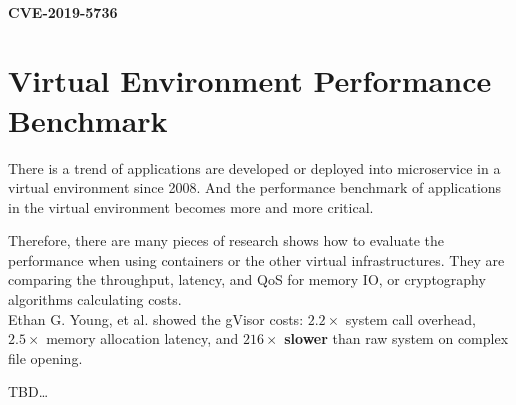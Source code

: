 
\paragraph{CVE-2019-5736}


\section{Virtual Environment Performance Benchmark}
There is a trend of applications are developed or deployed into microservice in a virtual
environment since 2008. And the performance benchmark of applications in the virtual
environment becomes more and more critical.

Therefore, there are many pieces of research shows how to evaluate the performance when
using containers or the other virtual infrastructures\cite{7371699,KOZHIRBAYEV2017175,7095802,234857}.
They are comparing the throughput, latency, and QoS for memory IO, or cryptography
algorithms calculating costs.\\

Ethan G. Young, et al.\cite{234857} showed the gVisor costs: $2.2\times$ system call overhead,
$2.5\times$ memory allocation latency, and $216\times$ \textbf{slower} than raw system on
complex file opening.

TBD\dots
